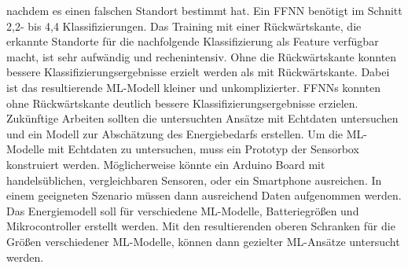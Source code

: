 nachdem es einen falschen Standort bestimmt hat.
Ein FFNN benötigt im Schnitt 2,2- bis 4,4 Klassifizierungen.
\newline
\newline
Das Training mit einer Rückwärtskante, die erkannte Standorte für die nachfolgende Klassifizierung als Feature verfügbar macht, ist sehr aufwändig und rechenintensiv.
Ohne die Rückwärtskante konnten bessere Klassifizierungsergebnisse erzielt werden als mit Rückwärtskante.
Dabei ist das resultierende ML-Modell kleiner und unkomplizierter.
FFNNs konnten ohne Rückwärtskante deutlich bessere Klassifizierungsergebnisse erzielen.
\newline
\newline
Zukünftige Arbeiten sollten die untersuchten Ansätze mit Echtdaten untersuchen und ein Modell zur Abschätzung des Energiebedarfs erstellen.
Um die ML-Modelle mit Echtdaten zu untersuchen, muss ein Prototyp der Sensorbox konstruiert werden.
Möglicherweise könnte ein Arduino Board mit handelsüblichen, vergleichbaren Sensoren, oder ein Smartphone ausreichen.
In einem geeigneten Szenario müssen dann ausreichend Daten aufgenommen werden.
\newline
\newline
Das Energiemodell soll für verschiedene ML-Modelle, Batteriegrößen und Mikrocontroller erstellt werden.
Mit den resultierenden oberen Schranken für die Größen verschiedener ML-Modelle,
können dann gezielter ML-Ansätze untersucht werden.